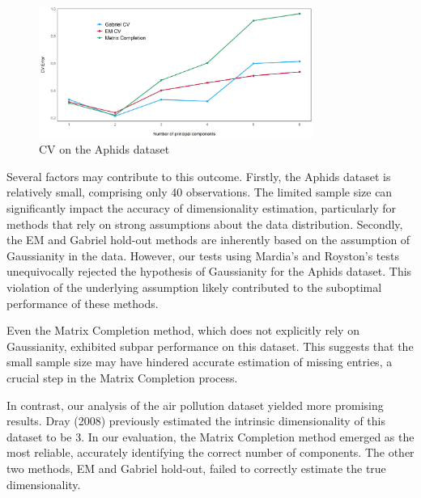 \documentclass{article}
\begin{document}
\begin{figure}[h!]
    \centering
    \includegraphics[width=0.8\textwidth]{aphids.png}
    \caption{CV on the Aphids dataset}
    \label{fig:aphids}
\end{figure}

Several factors may contribute to this outcome. Firstly, the Aphids dataset is relatively small, comprising 
only 40 observations. The limited sample size can significantly impact the accuracy of dimensionality 
estimation, particularly for methods that rely on strong assumptions about the data distribution.
Secondly, the EM and Gabriel hold-out methods are inherently based on the assumption of Gaussianity in the 
data. However, our tests using Mardia's and Royston's tests unequivocally rejected the hypothesis of 
Gaussianity for the Aphids dataset. This violation of the underlying assumption likely contributed to the 
suboptimal performance of these methods.

Even the Matrix Completion method, which does not explicitly rely on Gaussianity, exhibited subpar performance 
on this dataset. This suggests that the small sample size may have hindered accurate estimation of missing 
entries, a crucial step in the Matrix Completion process.

In contrast, our analysis of the air pollution dataset yielded more promising results. Dray (2008) \cite{Dray} 
previously estimated the intrinsic dimensionality of this dataset to be 3. In our evaluation, the Matrix 
Completion method emerged as the most reliable, accurately identifying the correct number of components. 
The other two methods, EM and Gabriel hold-out, failed to correctly estimate the true dimensionality.
\end{document}
